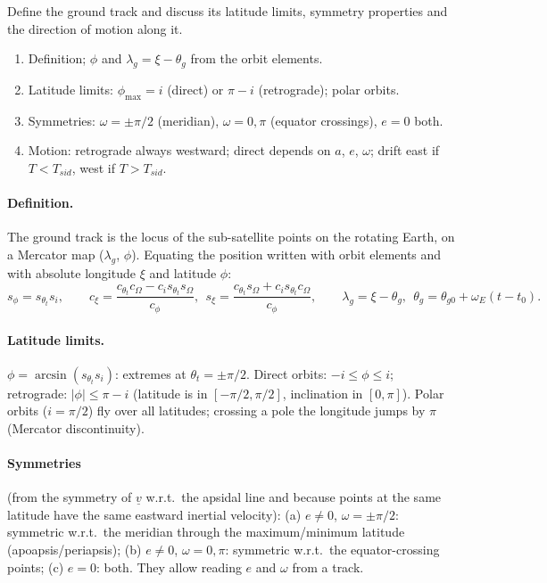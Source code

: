 \begin{qbox}
Define the ground track and discuss its latitude limits, symmetry properties and the direction of motion along it.
\end{qbox}
\begin{outline}
\begin{enumerate}
\item Definition; $\phi$ and $\lambda_g=\xi-\theta_g$ from the orbit elements.
\item Latitude limits: $\phi_{\max}=i$ (direct) or $\pi-i$ (retrograde); polar orbits.
\item Symmetries: $\omega=\pm\pi/2$ (meridian), $\omega=0,\pi$ (equator crossings), $e=0$ both.
\item Motion: retrograde always westward; direct depends on $a$, $e$, $\omega$; drift east if $T<T_{sid}$, west if $T>T_{sid}$.
\end{enumerate}
\end{outline}
\answer
\paragraph{Definition.} The ground track is the locus of the sub-satellite points on the rotating Earth, on a Mercator map ($\lambda_g$, $\phi$).
Equating the position written with orbit elements and with absolute longitude $\xi$ and latitude $\phi$:
\begin{equation}
s_\phi=s_{\theta_t}s_i,\qquad c_\xi=\frac{c_{\theta_t}c_\Omega-c_is_{\theta_t}s_\Omega}{c_\phi},\ \ s_\xi=\frac{c_{\theta_t}s_\Omega+c_is_{\theta_t}c_\Omega}{c_\phi},\qquad
\lambda_g=\xi-\theta_g,\ \ \theta_g=\theta_{g0}+\omega_E(t-t_0).
\end{equation}
\paragraph{Latitude limits.} $\phi=\arcsin(s_{\theta_t}s_i)$: extremes at $\theta_t=\pm\pi/2$. Direct orbits: $-i\le\phi\le i$; retrograde: $|\phi|\le\pi-i$
(latitude is in $[-\pi/2,\pi/2]$, inclination in $[0,\pi]$). Polar orbits ($i=\pi/2$) fly over all latitudes; crossing a pole the longitude jumps by
$\pi$ (Mercator discontinuity).
\paragraph{Symmetries} (from the symmetry of $\underline v$ w.r.t.\ the apsidal line and because points at the same latitude have the same eastward
inertial velocity): (a) $e\neq0$, $\omega=\pm\pi/2$: symmetric w.r.t.\ the meridian through the maximum/minimum latitude (apoapsis/periapsis);
(b) $e\neq0$, $\omega=0,\pi$: symmetric w.r.t.\ the equator-crossing points; (c) $e=0$: both. They allow reading $e$ and $\omega$ from a track.
